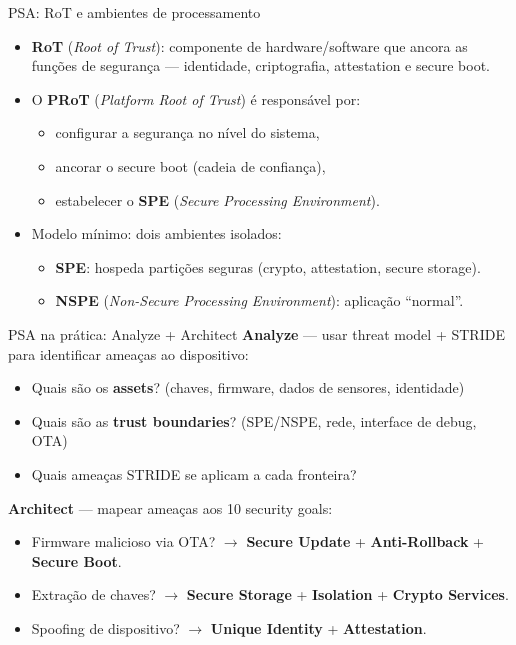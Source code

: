 \documentclass{beamer}
\begin{document}
\begin{frame}{PSA: RoT e ambientes de processamento}
\begin{itemize}
  \item \textbf{RoT} (\textit{Root of Trust}): componente de hardware/software que ancora as funções de segurança --- identidade, criptografia, attestation e secure boot.
  \item O \textbf{PRoT} (\textit{Platform Root of Trust}) é responsável por:
  \begin{itemize}
    \item configurar a segurança no nível do sistema,
    \item ancorar o secure boot (cadeia de confiança),
    \item estabelecer o \textbf{SPE} (\textit{Secure Processing Environment}).
  \end{itemize}
  \item Modelo mínimo: dois ambientes isolados:
  \begin{itemize}
    \item \textbf{SPE}: hospeda partições seguras (crypto, attestation, secure storage).
    \item \textbf{NSPE} (\textit{Non-Secure Processing Environment}): aplicação ``normal''.
  \end{itemize}
\end{itemize}
\end{frame}

\begin{frame}{PSA na prática: Analyze + Architect}
\small
\textbf{Analyze} --- usar threat model + STRIDE para identificar ameaças ao dispositivo:
\begin{itemize}
  \item Quais são os \textbf{assets}? (chaves, firmware, dados de sensores, identidade)
  \item Quais são as \textbf{trust boundaries}? (SPE/NSPE, rede, interface de debug, OTA)
  \item Quais ameaças STRIDE se aplicam a cada fronteira?
\end{itemize}

\vspace{0.3em}
\textbf{Architect} --- mapear ameaças aos 10 security goals:
\begin{itemize}
  \item Firmware malicioso via OTA? $\rightarrow$ \textbf{Secure Update} + \textbf{Anti-Rollback} + \textbf{Secure Boot}.
  \item Extração de chaves? $\rightarrow$ \textbf{Secure Storage} + \textbf{Isolation} + \textbf{Crypto Services}.
  \item Spoofing de dispositivo? $\rightarrow$ \textbf{Unique Identity} + \textbf{Attestation}.
\end{itemize}
\end{frame}
\end{document}
